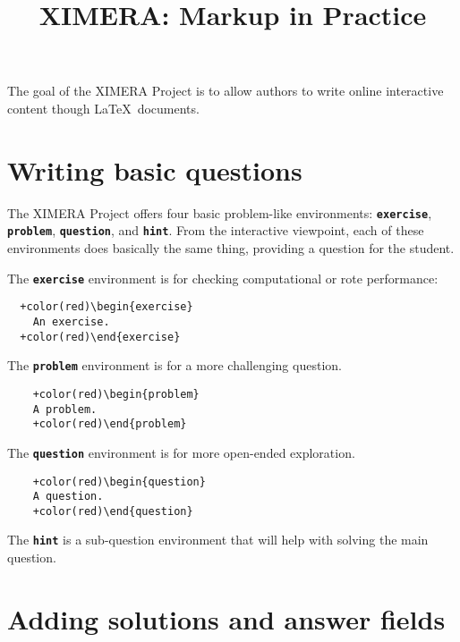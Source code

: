 \documentclass{amsart}
\newcommand\code[1]{{\bfseries\texttt{#1}}}
\begin{document}
\title{XIMERA: Markup in Practice}
\maketitle

\tableofcontents

The goal of the XIMERA Project is to allow authors to write online
interactive content though \LaTeX\ documents.


\section{Writing basic questions}


The XIMERA Project offers four basic problem-like environments:
\code{exercise}, \code{problem}, \code{question}, and
\code{hint}. From the interactive viewpoint, each of these
environments does basically the same thing, providing a question for
the student.

The \code{exercise} environment is for checking computational or rote
performance:

\begin{Verbatim}
  +color(red)\begin{exercise}
    An exercise.
  +color(red)\end{exercise}
\end{Verbatim}

The \code{problem} environment is for a more challenging question.

\begin{Verbatim}
    +color(red)\begin{problem}
    A problem.
    +color(red)\end{problem}
\end{Verbatim}

The \code{question} environment is for more open-ended exploration. 

\begin{Verbatim}
    +color(red)\begin{question}
    A question.
    +color(red)\end{question}
\end{Verbatim}

The \code{hint} is a sub-question environment that will help with
solving the main question.



\section{Adding solutions and answer fields}
\end{document}
